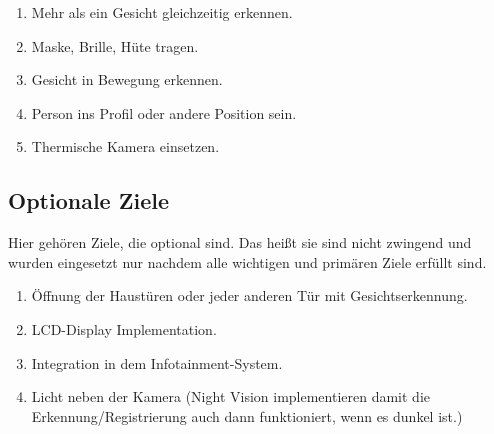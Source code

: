 \begin{enumerate}
	\item Mehr als ein Gesicht gleichzeitig erkennen.
	
	\item Maske, Brille, Hüte tragen.
	
	\item Gesicht in Bewegung erkennen. 
	
	\item Person ins Profil oder andere Position sein.
	
	\item Thermische Kamera einsetzen.
	
	
\end{enumerate}
\subsection{Optionale Ziele}
Hier gehören Ziele, die optional sind. Das heißt sie sind nicht zwingend und wurden eingesetzt nur nachdem alle wichtigen und primären Ziele erfüllt sind.

\begin{enumerate}
	
	
	\item Öffnung der Haustüren oder jeder anderen Tür mit Gesichtserkennung.
	
	\item LCD-Display Implementation.
	
	\item Integration in dem Infotainment-System.
	
	\item Licht neben der Kamera (Night Vision implementieren damit die Erkennung/Registrierung auch dann funktioniert, wenn es dunkel ist.)
\end{enumerate}
